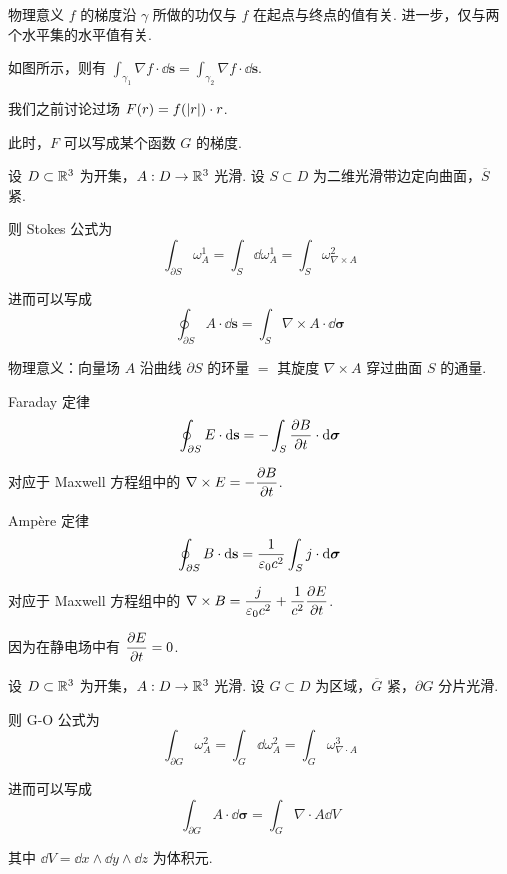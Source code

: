 \textcolor{mydarkblue}{物理意义} $f$ 的梯度沿 $\gamma$ 所做的功仅与 $f$ 在起点与终点的值有关. 进一步，仅与两个水平集的水平值有关.


如图所示，则有 $\displaystyle\int_{\gamma_1}\nabla f\cdot\dd\mathbf{s}=\int_{\gamma_2}\nabla f\cdot\dd\mathbf{s}$.

\begin{example}
    我们之前讨论过场 $F(r)=f(\lvert{r}\rvert)\cdot r$.

    此时，$F$ 可以写成某个函数 $G$ 的梯度.
\end{example}


\begin{theorem}
    设 $D\subset\mathbb{R}^3$ 为开集，$A:D\to\mathbb{R}^3$ 光滑. 设 $S\subset D$ 为二维光滑带边定向曲面，$\overline{S}$ 紧.
    
    则 Stokes 公式为
$$
\int_{\partial S}\omega_A^1=\int_S\dd\omega_A^1=\int_S\omega_{\nabla\times A}^2
$$

    进而可以写成
$$
\oint_{\partial S}A\cdot\dd\mathbf{s}=\int_S\nabla\times A\cdot\dd\bm{\sigma}
$$
\end{theorem}

\textcolor{mydarkblue}{物理意义：}向量场 $A$ 沿曲线 $\partial S$ 的环量 $=$ 其旋度 $\nabla\times A$ 穿过曲面 $S$ 的通量.


\begin{example}
    Faraday 定律
$$
\oint_{\partial S} E\cdot\mathrm{d}\mathbf{s}=-\int_S\frac{\partial{B}}{\partial{t}}\cdot\mathrm{d}\bm{\sigma}
$$

    对应于 Maxwell 方程组中的 $\displaystyle\nabla\times E=-\frac{\partial{B}}{\partial{t}}$.
\end{example}

\begin{example}
    Ampère 定律
$$
\oint_{\partial S}B\cdot\mathrm{d}\mathbf{s}=\frac{1}{\varepsilon_0c^2}\int_S j\cdot\mathrm{d}\bm{\sigma}
$$

    对应于 Maxwell 方程组中的 $\displaystyle\nabla\times B=\frac{j}{\varepsilon_0c^2}+\frac{1}{c^2}\frac{\partial{E}}{\partial{t}}$.

    因为在静电场中有 $\displaystyle\frac{\partial{E}}{\partial{t}}=0$.
\end{example}


\begin{theorem}
    设 $D\subset\mathbb{R}^3$ 为开集，$A:D\to\mathbb{R}^3$ 光滑. 设 $G\subset D$ 为区域，$\overline G$ 紧，$\partial G$ 分片光滑.

    则 G-O 公式为
$$
\int_{\partial G}\omega_A^2=\int_G\dd\omega_A^2=\int_G\omega_{\nabla\cdot A}^3
$$

    进而可以写成
$$
\int_{\partial G}A\cdot\dd\bm{\sigma}=\int_G\nabla\cdot A\dd V
$$

    其中 $\dd V=\dd x\wedge\dd y\wedge\dd z$ 为体积元.
\end{theorem}

